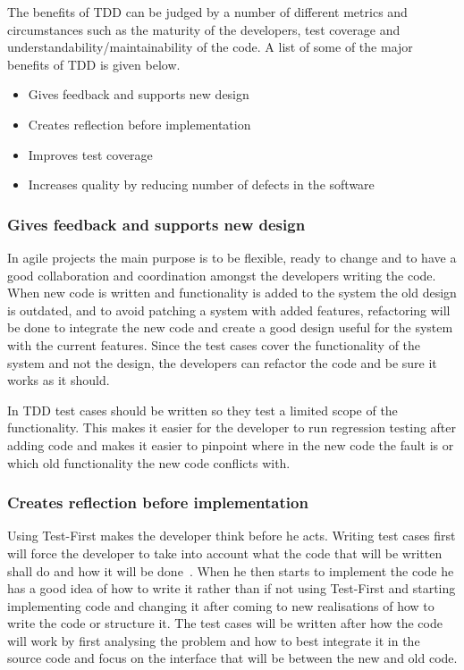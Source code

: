 The benefits of TDD can be judged by a number of different metrics and circumstances such as the maturity of the developers, test coverage and understandability/maintainability of the code. A list of some of the major benefits of TDD is given below.

\begin{itemize}
\item Gives feedback and supports new design\cite{tddbyexample}
\item Creates reflection before implementation
\item Improves test coverage
\item Increases quality by reducing number of defects in the software
\end{itemize}

\subsubsection*{Gives feedback and supports new design}
In agile projects the main purpose is to be flexible, ready to change and to have a good collaboration and coordination amongst the developers writing the code. When new code is written and functionality is added to the system the old design is outdated\cite{refactor}, and to avoid patching a system with added features, refactoring will be done to integrate the new code and create a good design useful for the system with the current features. 
Since the test cases cover the functionality of the system and not the design, the developers can refactor the code and be sure it works as it should. 

In TDD test cases should be written so they test a limited scope of the functionality. This makes it easier for the developer to run regression testing after adding code and makes it easier to pinpoint where in the new code the fault is or which old functionality the new code conflicts with.

\subsubsection*{Creates reflection before implementation}
Using Test-First makes the developer think before he acts. Writing test cases first will force the developer to take into account what the code that will be written shall do and how it will be done~\cite{erdogmus}. When he then starts to implement the code he has a good idea of how to write it rather than if not using Test-First and starting implementing code and changing it after coming to new realisations of how to write the code or structure it. The test cases will be written after how the code will work by first analysing the problem and how to best integrate it in the source code and focus on the interface that will be between the new and old code.

